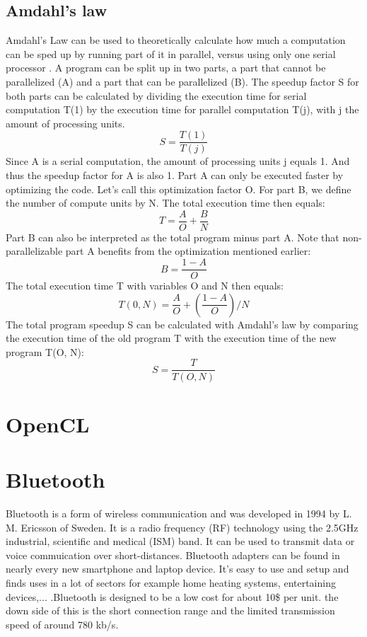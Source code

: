 \documentclass[a4paper, 11pt]{report}
\begin{document}
	\subsection{Amdahl's law}
Amdahl's Law can be used to theoretically calculate how much a computation can be sped up by running part of it in parallel, versus using only one serial processor \cite{amdahlslaw}. A program can be split up in two parts, a part that cannot be parallelized (A) and a part that can be parallelized (B). The speedup factor S for both parts can be calculated by dividing the execution time for serial computation T(1) by the execution time for parallel computation T(j), with j the amount of processing units.
\begin{equation}
	S = \frac{T(1)}{T(j)}
\end{equation}
Since A is a serial computation, the amount of processing units j equals 1. And thus the speedup factor for A is also 1. Part A can only be executed faster by optimizing the code. Let's call this optimization factor O. For part B, we define the number of compute units by N. The total execution time then equals:
\begin{equation}
	T = \frac{A}{O} + \frac{B}{N}	
\end{equation}
Part B can also be interpreted as the total program minus part A. Note that non-parallelizable part A benefits from the optimization mentioned earlier:
\begin{equation}
	B = \frac{1-A}{O}
\end{equation}
The total execution time T with variables O and N then equals:
\begin{equation}
	T(0, N) = \frac{A}{O} + (\frac{1-A}{O})/N
\end{equation}
The total program speedup S can be calculated with Amdahl's law by comparing the execution time of the old program T with the execution time of the new program T(O, N):
\begin{equation}
	S  = \frac{T}{T(O, N)}
\end{equation}


	\section{OpenCL}\label{subsec:OpenCL}
	
	\section{Bluetooth}
Bluetooth is a form of wireless communication and was developed in 1994 by L. M. Ericsson of Sweden. It is a radio frequency (RF) technology using the 2.5GHz industrial, scientific and medical (ISM) band. It can be used to transmit data or voice commuication over short-distances. Bluetooth adapters can be found in nearly every new smartphone and laptop device. It's easy to use and setup and finds uses in a lot of sectors for example home heating systems, entertaining devices,... .Bluetooth is designed to be a low cost for about 10\$ per unit. the down side of this is the short connection range and the limited transmission speed of around 780 kb/s\cite{Bluetooth}.\\
\end{document}
